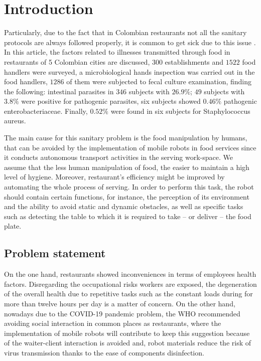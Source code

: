 \cleardoublepage %
\chapter{Introduction}
Particularly, due to the fact that in Colombian restaurants not all the sanitary protocols are always followed properly, it is common to get sick due to this issue \citep{florez2011factores}. In this article, the factors related to illnesses transmitted through food in restaurants of 5 Colombian cities are discussed, $300$ establishments and $1522$ food handlers were surveyed, a microbiological hands inspection was carried out in the food handlers, $1286$ of them were subjected to fecal culture examination, finding the following: intestinal parasites in $346$ subjects with $26.9\%$; $49$ subjects with $3.8\%$ were positive for pathogenic parasites, six subjects showed $0.46\%$ pathogenic enterobacteriaceae. Finally, $0.52\%$ were found in six subjects for Staphylococcus aureus. 

The main cause for this sanitary problem is the food manipulation by humans, that can be avoided by the implementation of mobile robots in food services since it conducts autonomous transport activities in the serving work-space. We assume that the less human manipulation of food, the easier to maintain a high level of hygiene. Moreover, restaurant's efficiency might be improved by automating the whole process of serving. In order to perform this task, the robot should contain certain functions, for instance, the perception of its environment and the ability to avoid static and dynamic obstacles, as well as specific tasks such as detecting the table to which it is required to take \--- or deliver \--- the food plate.




\section{Problem statement}

On the one hand, restaurants showed inconveniences in terms of employees health factors. Disregarding the occupational risks workers are exposed, the degeneration of the overall health due to repetitive tasks such as the constant loads during for more than twelve hours per day is a matter of concern.
%
On the other hand, nowadays due to the COVID-19 pandemic problem, the WHO recommended avoiding social interaction in common places as restaurants, where the implementation of mobile robots will contribute to keep this suggestion because of the waiter-client interaction is avoided and, robot materials reduce the risk of virus transmission thanks to the ease of components disinfection.


